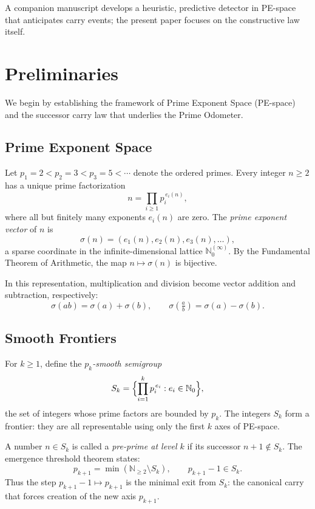 \documentclass[12pt]{article}
\theoremstyle{definition}
\theoremstyle{remark}
\begin{document}
A companion manuscript develops a heuristic, predictive detector in PE-space that anticipates carry events; the present paper focuses on the constructive law itself.


\section{Preliminaries}

We begin by establishing the framework of Prime Exponent Space (PE-space) and the successor
carry law that underlies the Prime Odometer.

\subsection{Prime Exponent Space}

Let $p_1 = 2 < p_2 = 3 < p_3 = 5 < \cdots$ denote the ordered primes. Every integer $n \geq 2$
has a unique prime factorization
\[
n = \prod_{i \geq 1} p_i^{\,e_i(n)},
\]
where all but finitely many exponents $e_i(n)$ are zero. The \emph{prime exponent vector} of $n$ is
\[
\sigma(n) = (e_1(n), e_2(n), e_3(n), \dots),
\]
a sparse coordinate in the infinite-dimensional lattice $\mathbb{N}_0^{(\infty)}$. By the
Fundamental Theorem of Arithmetic, the map $n \mapsto \sigma(n)$ is bijective.

In this representation, multiplication and division become vector addition and subtraction,
respectively:
\[
\sigma(ab) = \sigma(a) + \sigma(b), \qquad \sigma\!\left(\tfrac{a}{b}\right) = \sigma(a) - \sigma(b).
\]

\subsection{Smooth Frontiers}

For $k \geq 1$, define the \emph{$p_k$-smooth semigroup}
\[
S_k = \Bigl\{ \prod_{i=1}^k p_i^{\,e_i} : e_i \in \mathbb{N}_0 \Bigr\},
\]
the set of integers whose prime factors are bounded by $p_k$. The integers $S_k$ form a frontier:
they are all representable using only the first $k$ axes of PE-space.

A number $n \in S_k$ is called a \emph{pre-prime at level $k$} if its successor $n+1 \notin S_k$.
The emergence threshold theorem states:
\[
p_{k+1} = \min(\mathbb{N}_{\geq 2} \setminus S_k), \qquad p_{k+1}-1 \in S_k.
\]
Thus the step $p_{k+1}-1 \mapsto p_{k+1}$ is the minimal exit from $S_k$: the canonical carry that
forces creation of the new axis $p_{k+1}$.
\end{document}
